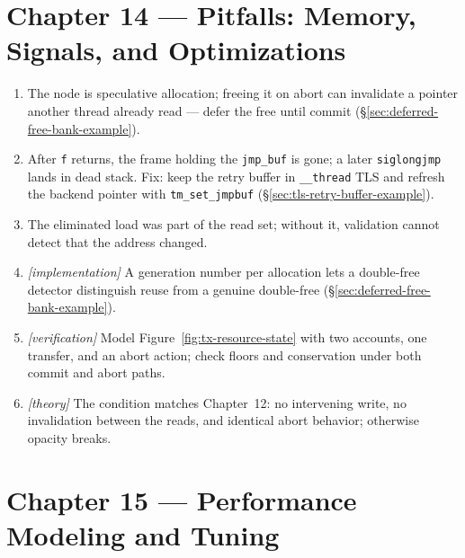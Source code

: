 \section*{Chapter 14 --- Pitfalls: Memory, Signals, and Optimizations}

\begin{enumerate}
    \item The node is speculative allocation; freeing it on abort can
          invalidate a pointer another thread already read --- defer the
          free until commit (\S\ref{sec:deferred-free-bank-example}).
    \item After \texttt{f} returns, the frame holding the \texttt{jmp\_buf}
          is gone; a later \texttt{siglongjmp} lands in dead stack.  Fix:
          keep the retry buffer in \texttt{\_\_thread} TLS and refresh the
          backend pointer with \texttt{tm\_set\_jmpbuf}
          (\S\ref{sec:tls-retry-buffer-example}).
    \item The eliminated load was part of the read set; without it,
          validation cannot detect that the address changed.
    \item \emph{[implementation]} A generation number per allocation lets a
          double-free detector distinguish reuse from a genuine double-free
          (\S\ref{sec:deferred-free-bank-example}).
    \item \emph{[verification]} Model Figure~\ref{fig:tx-resource-state} with
          two accounts, one transfer, and an abort action; check floors and
          conservation under both commit and abort paths.
    \item \emph{[theory]} The condition matches Chapter~12: no intervening
          write, no invalidation between the reads, and identical abort
          behavior; otherwise opacity breaks.
\end{enumerate}

\section*{Chapter 15 --- Performance Modeling and Tuning}

